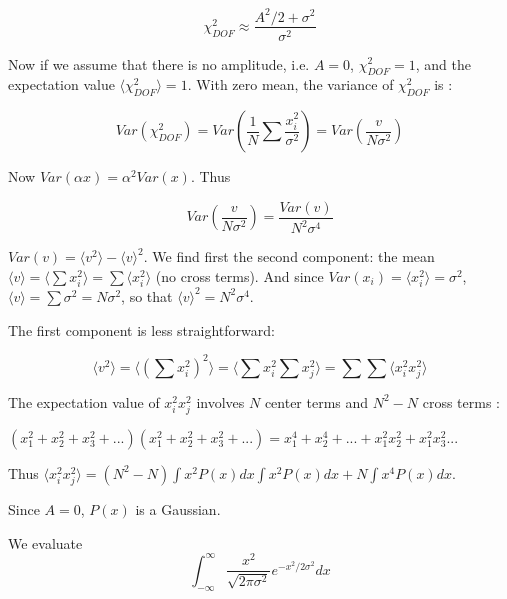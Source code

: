 \documentclass[fleqn,usenatbib]{mnras}  %
\begin{document}
\begin{equation}
\chi^{2}_{DOF} \approx \frac{A^{2}/2 + \sigma^{2}}{\sigma^{2}}
\end{equation}

Now if we assume that there is no amplitude, i.e. $A=0$, $\chi^{2}_{DOF} = 1$, and the expectation value $\langle \chi^{2}_{DOF} \rangle = 1$. With zero mean, the variance of $\chi^{2}_{DOF}$ is :

\begin{equation}
Var(\chi^{2}_{DOF}) = Var\left(\frac{1}{N} \sum \frac{x_{i}^{2}}{\sigma^{2}} \right) = Var\left(\frac{v}{N \sigma^{2}}\right)
\end{equation}

Now $Var(\alpha x) = \alpha^{2} Var(x)$. Thus 

\begin{equation} 
Var\left(\frac{v}{N \sigma^{2}}\right) = \frac{Var(v)}{N^{2} \sigma^{4}} 
\end{equation}

$Var(v) = \langle v^{2} \rangle - \langle v \rangle ^{2}$. We find first the second component:  the mean $\langle v \rangle = \langle \sum x_{i}^{2} \rangle = \sum \langle x_{i}^{2} \rangle $ (no cross terms). And since $Var(x_{i}) = \langle x_{i}^{2} \rangle= \sigma^{2}$, $\langle v \rangle = \sum \sigma^{2} = N \sigma^{2}$, so that $\langle v \rangle ^{2} = N^{2} \sigma^{4}$. 

The first component is less straightforward: 

\begin{equation}
\langle v^{2} \rangle  = \langle (\sum x_{i}^{2} ) ^{2} \rangle  =  \langle \sum x_{i}^{2}  \sum x_{j}^{2}   \rangle = \sum \sum \langle x_{i}^{2} x_{j}^{2} \rangle
\end{equation}

The expectation value of $x_{i}^{2} x_{j}^{2}$ involves $N$ center terms and $N^{2}-N$ cross terms : 

$(x_{1}^{2} + x_{2}^{2} +x_{3}^{2} +...)(x_{1}^{2} + x_{2}^{2} +x_{3}^{2} +...)= x_{1}^{4} + x_{2}^{4}+...+x_{1}^{2}x_{2}^{2} + x_{1}^{2}x_{3}^{2}...$

Thus $\langle x_{i}^{2} x_{j}^{2} \rangle = (N^{2}-N) \int x^{2} P(x) dx \int x^{2} P(x) dx  + N \int x^{4} P(x) dx  $. 

Since $A=0$, $P(x)$ is a Gaussian. 

We evaluate 
\begin{equation}
\int_{-\infty}^{\infty} \frac{x^{2}}{\sqrt{2\pi \sigma^{2}}} e^{-x^{2} / 2 \sigma^{2}} dx 
\end{equation}
\end{document}
